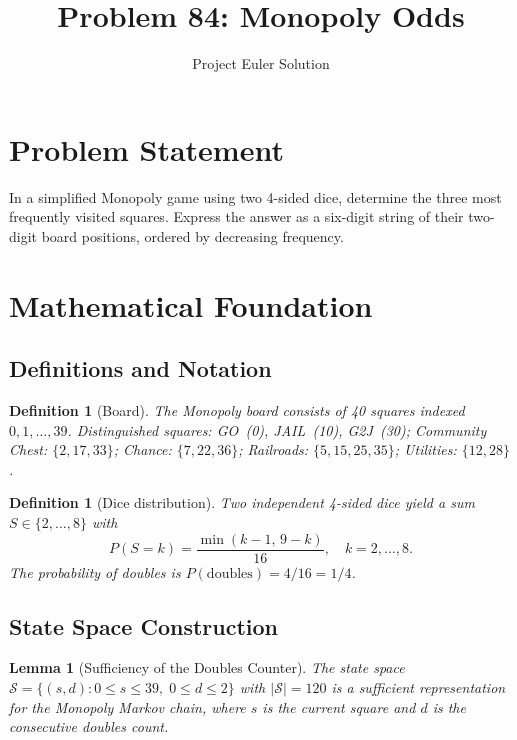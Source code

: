 \documentclass[12pt]{article}
\title{Problem 84: Monopoly Odds}
\author{Project Euler Solution}
\date{}
\newtheorem{lemma}[theorem]{Lemma}
\newtheorem{definition}[theorem]{Definition}
\begin{document}
\maketitle

\section{Problem Statement}

In a simplified Monopoly game using two 4-sided dice, determine the three most frequently visited squares. Express the answer as a six-digit string of their two-digit board positions, ordered by decreasing frequency.

\section{Mathematical Foundation}

\subsection{Definitions and Notation}

\begin{definition}[Board]
The Monopoly board consists of 40 squares indexed $0, 1, \ldots, 39$. Distinguished squares: GO~(0), JAIL~(10), G2J~(30); Community Chest: $\{2, 17, 33\}$; Chance: $\{7, 22, 36\}$; Railroads: $\{5, 15, 25, 35\}$; Utilities: $\{12, 28\}$.
\end{definition}

\begin{definition}[Dice distribution]
Two independent 4-sided dice yield a sum $S \in \{2, \ldots, 8\}$ with
\[
P(S = k) = \frac{\min(k-1,\, 9-k)}{16}, \quad k = 2, \ldots, 8.
\]
The probability of doubles is $P(\text{doubles}) = 4/16 = 1/4$.
\end{definition}

\subsection{State Space Construction}

\begin{lemma}[Sufficiency of the Doubles Counter]
The state space $\mathcal{S} = \{(s, d) : 0 \le s \le 39,\; 0 \le d \le 2\}$ with $|\mathcal{S}| = 120$ is a sufficient representation for the Monopoly Markov chain, where $s$ is the current square and $d$ is the consecutive doubles count.
\end{lemma}
\end{document}
